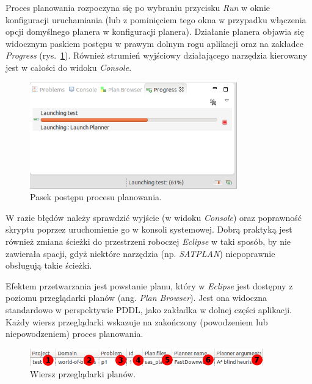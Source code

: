Proces planowania rozpoczyna się po wybraniu przycisku \emph{Run} w oknie konfiguracji uruchamiania (lub z pominięciem tego okna w przypadku włączenia opcji domyślnego planera w konfiguracji planera). Działanie planera objawia się widocznym paskiem postępu w prawym dolnym rogu aplikacji oraz na zakładce \emph{Progress} (rys.~\ref{fig:run_progress}). Również strumień wyjściowy działającego narzędzia kierowany jest w całości do widoku \emph{Console}.

\begin{figure}[h!]
    \centering
    \includegraphics[width=0.8\textwidth]{img/run_progress}
    \caption{Pasek postępu procesu planowania.}
    \label{fig:run_progress}
\end{figure}

W razie błędów należy sprawdzić wyjście (w widoku \emph{Console}) oraz poprawność skryptu poprzez uruchomienie go w konsoli systemowej. Dobrą praktyką jest również zmiana ścieżki do przestrzeni roboczej \emph{Eclipse} w taki sposób, by nie zawierała spacji, gdyż niektóre narzędzia (np. \emph{SATPLAN}) niepoprawnie obsługują takie ścieżki.

Efektem przetwarzania jest powstanie planu, który w \textit{Eclipse} jest dostępny z poziomu przeglądarki planów (ang. \textit{Plan Browser}). Jest ona widoczna standardowo w perspektywie PDDL, jako zakładka w dolnej części aplikacji. Każdy wiersz przeglądarki wskazuje na zakończony (powodzeniem lub niepowodzeniem) proces planowania. 

\begin{figure}[h!]
    \centering
    \includegraphics[width=0.9\textwidth]{img/plan_browser_row}
    \caption{Wiersz przeglądarki planów.}
    \label{fig:plan_browser_row}
\end{figure}

